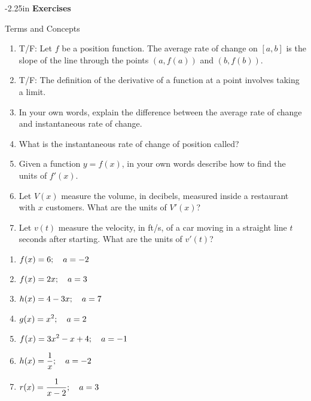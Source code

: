 \begin{adjustwidth*}{}{-2.25in}
\textbf{{\large Exercises}}
\setlength{\columnsep}{25pt}
\begin{multicols*}{2}
\noindent Terms and Concepts \small
\begin{enumerate}[1)]
\item {T/F: Let $f$ be a position function. The average rate of change on $[a,b]$ is the slope of the line through the points $(a, f(a))$ and $(b,f(b))$.}
\item {T/F: The definition of the derivative of a function at a point involves taking a limit.}
\item {In your own words, explain the difference between the average rate of change and instantaneous rate of change.}
\item What is the instantaneous rate of change of position called?
\item Given a function $y=f(x)$, in your own words describe how to find the units of $f'(x)$.
\item Let $V(x)$ measure the volume, in decibels, measured inside a restaurant with $x$ customers. What are the units of $V'(x)$?
\item Let $v(t)$ measure the velocity, in ft/s, of a car moving in a straight line $t$ seconds after starting. What are the units of $v'(t)$?
\end{enumerate} 

 \small


\begin{enumerate}[1),resume]
\item $\displaystyle f(x) = 6; \quad a = -2$
\item $\displaystyle f(x) = 2x; \quad a = 3$
\item $\displaystyle h(x) = 4 - 3x; \quad a = 7$
\item $\displaystyle g(x) = x^2; \quad a = 2$
\item $\displaystyle f(x) = 3x^2 - x + 4; \quad a = -1$
\item $\displaystyle h(x) = \frac{1}{x}; \quad a = -2$
\item $\displaystyle r(x) = \frac{1}{x-2}; \quad a = 3$
\end{enumerate}


\end{multicols*}
\end{adjustwidth*}
